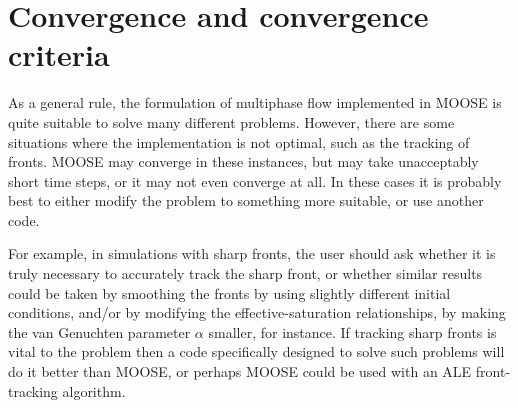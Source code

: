 \documentclass[]{scrreprt}
\begin{document}
\chapter{Convergence and convergence criteria}

As a general rule, the formulation of multiphase flow implemented in
MOOSE is quite suitable to solve many different problems.  However,
there are some situations where the implementation is not optimal,
such as the tracking of fronts.  MOOSE may converge in these
instances, but may take unacceptably short time steps, or it may not
even converge at all.  In these cases it is probably best to either
modify the problem to something more suitable, or use another code.

For example, in simulations with sharp fronts, the user should ask
whether it is truly necessary to accurately track the sharp front, or
whether similar results could be taken by smoothing the fronts by
using slightly different initial conditions, and/or by modifying the
effective-saturation relationships, by making the van Genuchten
parameter $\alpha$ smaller, for instance.  If tracking sharp fronts is
vital to the problem then a code specifically designed to solve such
problems will do it better than MOOSE, or perhaps MOOSE could be used
with an ALE front-tracking algorithm.
\end{document}
